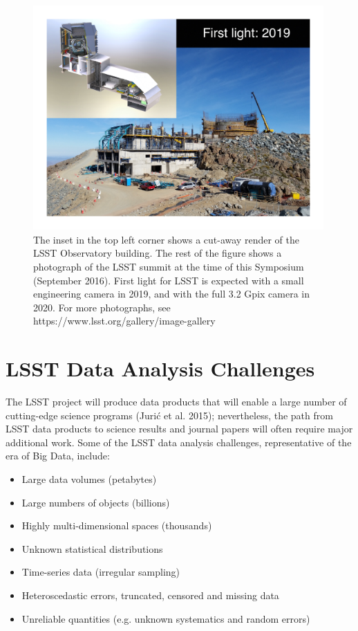 \documentclass{iau}
\begin{document}
\begin{figure}[t!]
\begin{center}
\includegraphics[width=0.99\textwidth, angle=0]{summit2019.pdf} 
\caption{
The inset in the top left corner shows a cut-away render of the LSST Observatory building. 
The rest of the figure shows a photograph of the LSST summit at the time of this 
Symposium (September 2016). First light for LSST is expected with a small engineering
camera in 2019, and with the full 3.2 Gpix camera in 2020. For more 
photographs, see https://www.lsst.org/gallery/image-gallery}
\label{fig:summit2019}
\end{center}
\end{figure}



\section{LSST Data Analysis Challenges}


The LSST project will produce data products that will enable a large number of cutting-edge science 
programs (Juri\'{c} et al. 2015); nevertheless, the path from LSST data products to science results and 
journal papers will often require major additional work. Some of the
LSST data analysis challenges, representative of the era of Big Data, include:
\begin{itemize}
\item Large data volumes (petabytes)
\item Large numbers of objects (billions)
\item Highly multi-dimensional spaces (thousands)
\item Unknown statistical distributions 
\item Time-series data (irregular sampling)
\item Heteroscedastic errors, truncated, censored and missing data
\item Unreliable quantities (e.g. unknown systematics and random errors)
\end{itemize}
\end{document}
